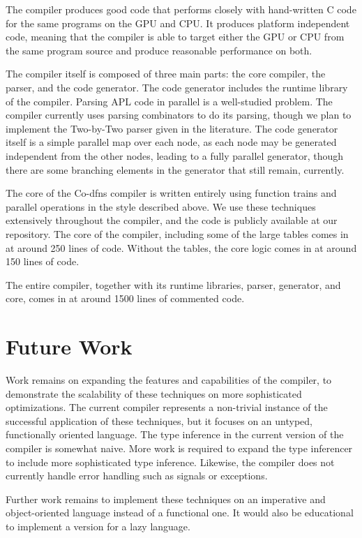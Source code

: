 \documentclass[numbers,preprint]{sigplanconf}
\begin{document}
The compiler produces good code that performs closely with hand-written 
C code for the same programs on the GPU and CPU. It produces platform 
independent code, meaning that the compiler is able to target either the 
GPU or CPU from the same program source and produce reasonable performance 
on both. 

The compiler itself is composed of three main parts: the core compiler, 
the parser, and the code generator. The code generator includes the runtime 
library of the compiler. Parsing APL code in parallel is a well-studied 
problem. The compiler currently uses parsing combinators to do its parsing, 
though we plan to implement the Two-by-Two parser given in the literature. 
The code generator itself is a simple parallel map over each node, as 
each node may be generated independent from the other nodes, leading to a 
fully parallel generator, though there are some branching elements in the 
generator that still remain, currently. 

The core of the Co-dfns compiler is written entirely using function trains 
and parallel operations in the style described above. We use these techniques 
extensively throughout the compiler, and the code is publicly available 
at our repository. The core of the compiler, including some of the large 
tables comes in at around 250 lines of code. Without the tables, the core 
logic comes in at around 150 lines of code. 

The entire compiler, together with its runtime libraries, parser, generator, 
and core, comes in at around 1500 lines of commented code. 

\section{Future Work}

Work remains on expanding the features and capabilities of the compiler, 
to demonstrate the scalability of these techniques on more sophisticated 
optimizations. The current compiler represents a non-trivial instance of 
the successful application of these techniques, but it focuses on an untyped, 
functionally oriented language. The type inference in the current version 
of the compiler is somewhat naive. More work is required to expand the 
type inferencer to include more sophisticated type inference. Likewise, 
the compiler does not currently handle error handling such as signals or 
exceptions. 

Further work remains to implement these techniques on an imperative and 
object-oriented language instead of a functional one. It would also be 
educational to implement a version for a lazy language. 
\end{document}
